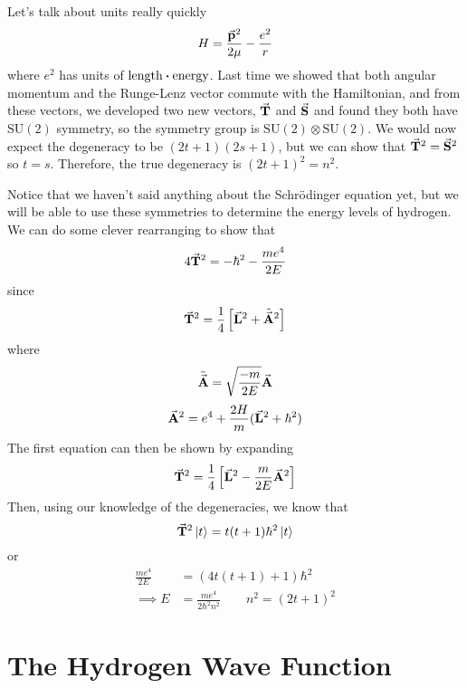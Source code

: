 \documentclass[a4paper,twoside,master.tex]{subfiles}
\begin{document}
Let's talk about units really quickly
\begin{equation}
    H = \frac{\va{p}^2}{2 \mu} - \frac{e^2}{r}
\end{equation}
where $ e^2 $ has units of $ \text{length} \vdot \text{energy} $. Last time we showed that both angular momentum and the Runge-Lenz vector commute with the Hamiltonian, and from these vectors, we developed two new vectors, $ \va{T} $ and $ \va{S} $ and found they both have $\text{SU}(2)$ symmetry, so the symmetry group is $ \text{SU}(2) \otimes \text{SU}(2) $. We would now expect the degeneracy to be $ (2t+1)(2s+1) $, but we can show that $ \va{T}^2 = \va{S}^2 $ so $ t = s $. Therefore, the true degeneracy is $ (2t+1)^2 = n^2 $.

Notice that we haven't said anything about the Schr\"odinger equation yet, but we will be able to use these symmetries to determine the energy levels of hydrogen. We can do some clever rearranging to show that
\begin{equation}
    4 \va{T}^2 = - \hbar^2 - \frac{m e^4}{2E}
\end{equation}
since
\begin{equation}
    \va{T}^2 = \frac{1}{4} \left[ \va{L}^2 + \tilde{\va{A}}^2 \right]
\end{equation}
where
\begin{equation}
    \tilde{\va{A}} = \sqrt{\frac{-m}{2E}} \va{A}
\end{equation}
\begin{equation}
    \va{A}^2 = e^4 + \frac{2H}{m} (\va{L}^2 + \hbar^2)
\end{equation}
The first equation can then be shown by expanding
\begin{equation}
    \va{T}^2 = \frac{1}{4} \left[ \va{L}^2 - \frac{m}{2 E} \va{A}^2 \right]
\end{equation}
Then, using our knowledge of the degeneracies, we know that
\begin{equation}
    \va{T}^2\ket{t} = t(t+1) \hbar^2\ket{t}
\end{equation}
or
\begin{align}
    \frac{m e^4}{2E} &= (4t(t+1) + 1) \hbar^2 \\
    \implies E &= \frac{m e^4}{2 \hbar^2 n^2} \qquad n^2 = (2t+1)^2
\end{align}

\section{The Hydrogen Wave Function}
\label{sec:the_hydrogen_wave_function}
\end{document}
